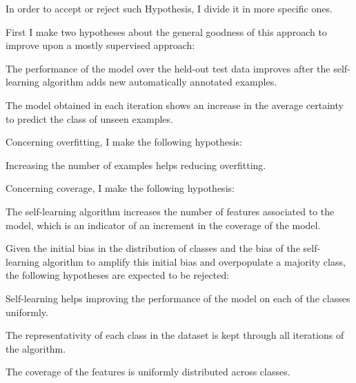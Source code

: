 In order to accept or reject such Hypothesis, I divide it in more specific
ones. 

First I make two hypotheses about the general goodness of this approach to
improve upon a mostly supervised approach:

\begin{subhypothesis}\label{hyp:self-learning:1}
  The performance of the model over the held-out test data improves after the
  self-learning algorithm adds new automatically annotated examples.
\end{subhypothesis}

\begin{subhypothesis}\label{hyp:self-learning:2}
  The model obtained in each iteration shows an increase in the average
  certainty to predict the class of unseen examples. 
\end{subhypothesis}

Concerning overfitting, I make the following hypothesis:

\begin{subhypothesis}\label{hyp:self-learning:3}
  Increasing the number of examples helps reducing overfitting.
\end{subhypothesis}

Concerning coverage, I make the following hypothesis: 

\begin{subhypothesis}\label{hyp:self-learning:4}
  The self-learning algorithm increases the number of features associated to
  the model, which is an indicator of an increment in the coverage of the
  model.
\end{subhypothesis} 

Given the initial bias in the distribution of classes and the bias of the
self-learning algorithm to amplify this initial bias and overpopulate a
majority class, the following hypotheses are expected to be rejected:

\begin{subhypothesis}\label{hyp:self-learning:5}
  Self-learning helps improving the performance of the model on each of the
  classes uniformly.
\end{subhypothesis}

\begin{subhypothesis}\label{hyp:self-learning:6}
  The representativity of each class in the dataset is kept through all
  iterations of the algorithm.
\end{subhypothesis}

\begin{subhypothesis}\label{hyp:self-learning:7}
  The coverage of the features is uniformly distributed across classes.
\end{subhypothesis}


